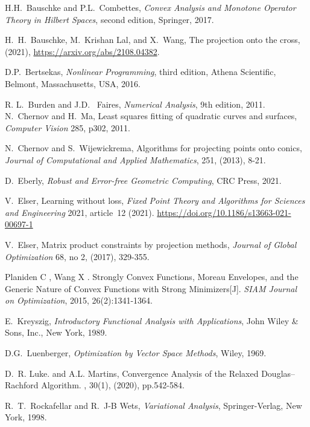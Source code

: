 \documentclass[12pt]{article}
\begin{document}
\begin{thebibliography}{999}

    H.H.\ Bauschke and P.L.\ Combettes,
    \emph{Convex Analysis and Monotone Operator Theory in Hilbert Spaces},
    second edition,
    Springer, 2017.

    H.~H.\ Bauschke, M.\ Krishan Lal, and X.\ Wang, The projection onto the cross, (2021), \url{https://arxiv.org/abs/2108.04382}.

    D.P.\ Bertsekas,
    \emph{Nonlinear Programming}, third edition, Athena Scientific, Belmont, Massachusetts, USA, 2016.

    R. L.\ Burden and J.D. \ Faires, \emph{Numerical Analysis}, 9th edition, 2011.
     N.\ Chernov and H.\ Ma, Least squares fitting of quadratic curves and surfaces, \emph{Computer Vision} 285, p302, 2011.

     N.\ Chernov and S.\ Wijewickrema,  Algorithms for projecting points onto conics, \emph{ Journal of Computational and Applied Mathematics}, 251, (2013), 8-21.

     D.\ Eberly, \emph{Robust and Error-free Geometric Computing}, CRC Press, 2021.

     V.\ Elser, Learning without loss,
    \emph{Fixed Point Theory and Algorithms for Sciences and Engineering} 2021, article~12 (2021).
    \url{https://doi.org/10.1186/s13663-021-00697-1}

    V.\ Elser, Matrix product constraints by projection methods, \emph{Journal of Global Optimization} 68, no 2, (2017), 329-355.

    Planiden C , Wang X . Strongly Convex Functions, Moreau Envelopes, and the Generic Nature of Convex Functions with Strong Minimizers[J]. \emph{SIAM Journal on Optimization}, 2015, 26(2):1341-1364.

    

     E.\ Kreyszig, \emph{Introductory Functional Analysis with Applications},
    John Wiley \& Sons, Inc., New York, 1989.

    D.G.\ Luenberger,
    \emph{Optimization by Vector Space Methods},
    Wiley, 1969.


    D.~R. Luke. and A.L. Martins, Convergence Analysis of the Relaxed Douglas--Rachford Algorithm. , 30(1), (2020), pp.542-584.

    R.\ T.\ Rockafellar and R.\ J-B Wets,
    \emph{Variational Analysis},
    Springer-Verlag, New York, 1998.

\end{thebibliography}
\end{document}
